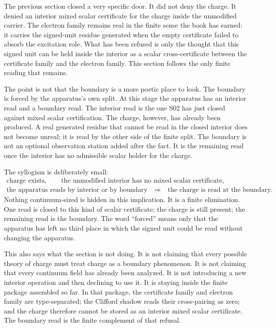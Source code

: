 The previous section closed a very specific door. It did not deny the charge.
It denied an interior mixed scalar certificate for the charge inside the
unmodified carrier. The electron family remains real in the finite sense the
book has earned: it carries the signed-unit residue generated when the empty
certificate failed to absorb the excitation role. What has been refused is only
the thought that this signed unit can be held inside the interior as a scalar
cross-certificate between the certificate family and the electron family. This
section follows the only finite reading that remains.

The point is not that the boundary is a more poetic place to look. The boundary
is forced by the apparatus's own split. At this stage the apparatus has an
interior read and a boundary read. The interior read is the one S02 has just
closed against mixed scalar certification. The charge, however, has already
been produced. A real generated residue that cannot be read in the closed
interior does not become unreal; it is read by the other side of the finite
split. The boundary is not an optional observation station added after the
fact. It is the remaining read once the interior has no admissible scalar
holder for the charge.

The syllogism is deliberately small:
\[
\begin{gathered}
  \text{charge exists},\qquad
  \text{the unmodified interior has no mixed scalar certificate},\\
  \text{the apparatus reads by interior or by boundary}
  \quad\Longrightarrow\quad
  \text{the charge is read at the boundary.}
\end{gathered}
\]
Nothing continuum-sized is hidden in this implication. It is a finite
elimination. One read is closed to this kind of scalar certificate; the charge
is still present; the remaining read is the boundary. The word ``forced'' means
only that the apparatus has left no third place in which the signed unit could
be read without changing the apparatus.

This also says what the section is not doing. It is not claiming that every
possible theory of charge must treat charge as a boundary phenomenon. It is not
claiming that every continuum field has already been analyzed. It is not
introducing a new interior operation and then declining to use it. It is staying
inside the finite package assembled so far. In that package, the certificate
family and electron family are type-separated; the Clifford shadow reads their
cross-pairing as zero; and the charge therefore cannot be stored as an
interior mixed scalar certificate. The boundary read is the finite complement
of that refusal.

